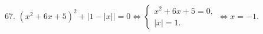 67. $(x^2+6x+5)^2+\left|1-|x|\right|=0 \Leftrightarrow \begin{cases} x^2+6x+5=0,\\ |x|=1.\end{cases}\Leftrightarrow x=-1.$\\
